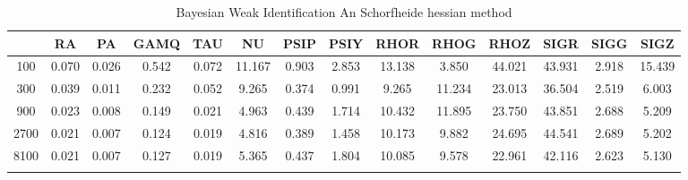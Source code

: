 \documentclass[a4paper,10pt]{article}
\begin{document}
\centering
\begin{longtable}{cccccccccccccc}
\toprule
 & RA & PA & GAMQ & TAU & NU & PSIP & PSIY & RHOR & RHOG & RHOZ & SIGR & SIGG & SIGZ \\
\midrule
100 & 0.070 & 0.026 & 0.542 & 0.072 & 11.167 & 0.903 & 2.853 & 13.138 & 3.850 & 44.021 & 43.931 & 2.918 & 15.439 \\
300 & 0.039 & 0.011 & 0.232 & 0.052 & 9.265 & 0.374 & 0.991 & 9.265 & 11.234 & 23.013 & 36.504 & 2.519 & 6.003 \\
900 & 0.023 & 0.008 & 0.149 & 0.021 & 4.963 & 0.439 & 1.714 & 10.432 & 11.895 & 23.750 & 43.851 & 2.688 & 5.209 \\
2700 & 0.021 & 0.007 & 0.124 & 0.019 & 4.816 & 0.389 & 1.458 & 10.173 & 9.882 & 24.695 & 44.541 & 2.689 & 5.202 \\
8100 & 0.021 & 0.007 & 0.127 & 0.019 & 5.365 & 0.437 & 1.804 & 10.085 & 9.578 & 22.961 & 42.116 & 2.623 & 5.130 \\
\bottomrule
\caption{Bayesian Weak Identification An Schorfheide hessian method}
\label{table:tbl:WeakAnScho_hessian}
\end{longtable}
\end{document}
